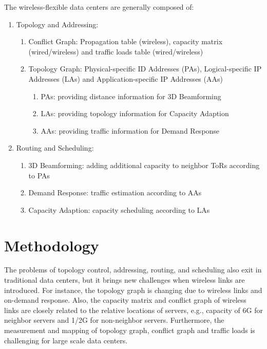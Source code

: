 \documentclass[journal,onecolumn,11pt]{IEEEtran}
\begin{document}
The wireless-flexible data centers are generally composed of:
\begin{enumerate}
  \item Topology and Addressing:
  \begin{enumerate}
    \item Conflict Graph: Propagation table (wireless), capacity matrix (wired/wireless) and traffic loads table (wired/wireless)
    \item Topology Graph: Physical-specific ID Addresses (PAs), Logical-specific IP Addresses (LAs) and Application-specific IP Addresses (AAs)
        \begin{enumerate}
        \item PAs: providing distance information for 3D Beamforming
        \item LAs: providing topology information for Capacity Adaption
        \item AAs: providing traffic information for Demand Response
        \end{enumerate}
  \end{enumerate}
  \item Routing and Scheduling:
  \begin{enumerate}
    \item 3D Beamforming: adding additional capacity to neighbor ToRs according to PAs
    \item Demand Response: traffic estimation according to AAs
    \item Capacity Adaption: capacity scheduling according to LAs
  \end{enumerate}
\end{enumerate}

\section{Methodology}

The problems of topology control, addressing, routing, and scheduling also exit in traditional data centers, but it brings new challenges when wireless links are introduced. For instance, the topology graph is changing due to wireless links and on-demand response. Also, the capacity matrix and conflict graph of wireless links are closely related to the relative locations of servers, e.g., capacity of 6G for neighbor servers and 1/2G for non-neighbor servers. Furthermore, the measurement and mapping of topology graph, conflict graph and traffic loads is challenging for large scale data centers.
\end{document}
